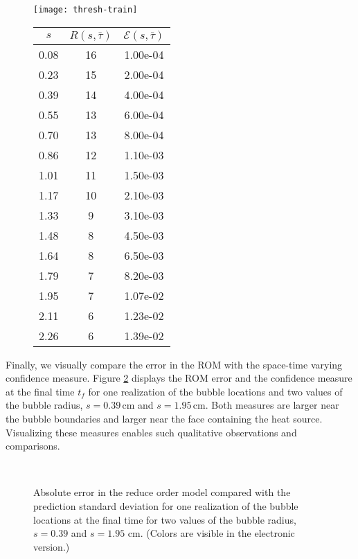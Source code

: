 \documentclass[final]{siamltex}
\begin{document}
\begin{figure}
\begin{minipage}[b]{0.49\textwidth}
  \centering \texttt{[image: thresh-train]}  
  \label{fig:error-train}
\end{minipage}
\hfill
\begin{minipage}[b]{0.49\textwidth}
\centering
\begin{tabular}{c|c|c}
$s$ & $R(s,\bar{\tau})$ & ${\mathcal{E}}(s,\bar{\tau})$\\
\hline
0.08 & 16 & 1.00e-04\\ 
0.23 & 15 & 2.00e-04\\
0.39 & 14 & 4.00e-04\\
0.55 & 13 & 6.00e-04\\
0.70 & 13 & 8.00e-04\\
0.86 & 12 & 1.10e-03\\
1.01 & 11 & 1.50e-03\\
1.17 & 10 & 2.10e-03\\ 
1.33 & 9 & 3.10e-03\\
1.48 & 8 & 4.50e-03\\ 
1.64 & 8 & 6.50e-03\\ 
1.79 & 7 & 8.20e-03\\
1.95 & 7 & 1.07e-02\\
2.11 & 6 & 1.23e-02\\ 
2.26 & 6 & 1.39e-02
\end{tabular}
\label{tab:thresh-train}
\end{minipage}
\end{figure}

Finally, we visually compare the error in the ROM with the space-time
varying confidence measure.  Figure \ref{fig:romvar} displays the ROM
error and the confidence measure at the final time $t_f$ for one
realization of the bubble locations and two values of the bubble
radius, $s=0.39\,\mathrm{cm}$ and $s=1.95\,\mathrm{cm}$. Both measures
are larger near the bubble boundaries and larger near the face
containing the heat source. Visualizing these measures enables such
qualitative observations and comparisons.

\begin{figure}[t]
\centering
{}\;
\\
\;
\caption{Absolute error in the reduce order model compared with the prediction
  standard deviation for one realization of the bubble locations at
  the final time for two values of the bubble radius, $s=0.39$ and
  $s=1.95$ cm. (Colors are visible in the electronic version.)}
\label{fig:romvar}
\end{figure} 
\end{document}
